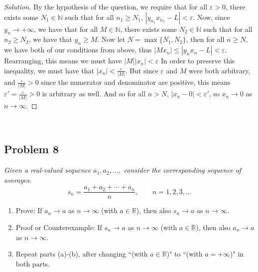 \documentclass{article}
\newcommand{\N}{{\mathbb N}}
\newcommand{\R}{{\mathbb R}}
\newcommand{\ep}{{\varepsilon}}
\begin{document}
\begin{proof}[Solution]\let\qed\relax
	By the hypothesis of the question,
	we require that for all $\ep > 0$,
	there exists some $N_1 \in \N$ such that for all $n_1 \geq N_1$,
	$|y_{n_1}x_{n_1} - L| < \ep$.
	Now, since $y_n \to +\infty$, we have that for all $M \in \N$,
	there exists some $N_2 \in \N$ such that for all $n_2 \geq N_2$,
	we have that $y_n \geq M$.
	Now let $N = \max\{N_1, N_2\}$,
	then for all $n \geq N$, we have both of our conditions from above,
	thus $|Mx_n| \leq |y_nx_n - L| < \ep$.
	Rearranging, this means we must have $|M||x_n| < \ep$ 
	In order to preserve this inequality, we must have that $|x_n| < \frac{\ep}{|M|}$.
	But since $\ep$ and $M$ were both arbitrary,
	and $\frac{\ep}{|M|} > 0$ since the numerator and denominator are positive,
	this means $\ep' = \frac{\ep}{|M|} > 0$ is arbitrary as well.
	And so for all $n > N$, $|x_n - 0| < \ep'$, so $x_n \to 0$ as $n \to \infty$.
\end{proof}
\clearpage
~\clearpage

\subsection*{Problem 8}
{\it Given a real-valued sequence $a_1,a_2,\dots,$ consider
the corresponding sequence of averages.
\[
	s_n = \frac{a_1 + a_2 + \cdots + a_n}{n}, \qquad n=1,2,3,\dots
\]
\begin{enumerate}
	\item Prove: If $a_n \to a$ as $n \to \infty$ (with $a \in \R$),
	then also $s_n \to a$ as $n \to \infty$.
	\item Proof or Counterexample: If $s_n \to a$ as $n \to \infty$
	(with $a \in \R$), then also $a_n \to a$ as $n \to \infty$.
	\item Repeat parts (a)-(b), after changing ``(with $a \in \R$)"
	to ``(with $a = +\infty$)" in both parts.
\end{enumerate}}
\end{document}
